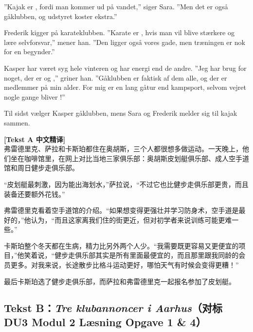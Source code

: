 ”Kajak er , fordi man kommer ud på vandet,” siger Sara. ”Men det er også   gåklubben, og udstyret koster ekstra.”

Frederik kigger på karateklubben. ”Karate er , hvis man vil blive stærkere og lære selvforsvar,” mener han. ”Den ligger også  vores gade, men træningen er nok  for en begynder.”

Kasper har været syg hele vinteren og har  energi end de andre. ”Jeg har brug for noget, der er  og ,” griner han. ”Gåklubben er faktisk  af dem alle, og der er  medlemmer på min alder. For mig er en lang gåtur  end kampsport, selvom vejret nogle gange bliver !”

Til sidst vælger Kasper gåklubben, mens Sara og Frederik melder sig til kajak sammen.

\begin{transbox}
\small
\textbf{\color{NCDTeal}[Tekst A 中文精译]}\\
弗雷德里克、萨拉和卡斯珀都住在奥胡斯，三个人都很想多做运动。一天晚上，他们坐在咖啡馆里，在网上对比当地三家俱乐部：奥胡斯皮划艇俱乐部、成人空手道馆和周日健步走俱乐部。

“皮划艇最刺激，因为能出海划水，”萨拉说，“不过它也比健步走俱乐部更贵，而且装备还要额外花钱。”

弗雷德里克看着空手道馆的介绍。“如果想变得更强壮并学习防身术，空手道是最好的，”他认为，“而且这家离我们住的街更近，但对初学者来说训练可能更难一些。”

卡斯珀整个冬天都在生病，精力比另外两个人少。“我需要既更容易又更便宜的项目，”他笑着说，“健步走俱乐部其实是所有里面最便宜的，而且那里跟我同龄的会员更多。对我来说，长途散步比格斗运动更好，哪怕天气有时候会变得更糟！”

最后卡斯珀选了健步走俱乐部，而萨拉和弗雷德里克一起报名参加了皮划艇。
\end{transbox}

\subsection*{Tekst B：\textit{Tre klubannoncer i Aarhus}（对标 DU3 Modul 2 Læsning Opgave 1 \& 4）}

